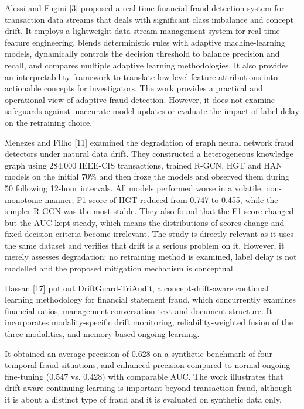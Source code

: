 \documentclass[11pt,letterpaper]{report}
\begin{document}
Alessi and Fugini [3] proposed a real-time financial fraud detection system for transaction data streams that deals with significant class imbalance and concept drift. It employs a lightweight data stream management system for real-time feature engineering, blends deterministic rules with adaptive machine-learning models, dynamically controls the decision threshold to balance precision and recall, and compares multiple adaptive learning methodologies. It also provides an interpretability framework to translate low-level feature attributions into actionable concepts for investigators. The work provides a practical and operational view of adaptive fraud detection. However, it does not examine safeguards against inaccurate model updates or evaluate the impact of label delay on the retraining choice.

Menezes and Filho [11] examined the degradation of graph neural network fraud detectors under natural data drift. They constructed a heterogeneous knowledge graph using 284,000 IEEE-CIS transactions, trained R-GCN, HGT and HAN models on the initial 70\% and then froze the models and observed them during 50 following 12-hour intervals. All models performed worse in a volatile, non-monotonic manner; F1-score of HGT reduced from 0.747 to 0.455, while the simpler R-GCN was the most stable. They also found that the F1 score changed but the AUC kept steady, which means the distributions of scores change and fixed decision criteria become irrelevant. The study is directly relevant as it uses the same dataset and verifies that drift is a serious problem on it. However, it merely assesses degradation: no retraining method is examined, label delay is not modelled and the proposed mitigation mechanism is conceptual.

Hassan [17] put out DriftGuard-TriAudit, a concept-drift-aware continual learning methodology for financial statement fraud, which concurrently examines financial ratios, management conversation text and document structure. It incorporates modality-specific drift monitoring, reliability-weighted fusion of the three modalities, and memory-based ongoing learning.

It obtained an average precision of 0.628 on a synthetic benchmark of four temporal fraud situations, and enhanced precision compared to normal ongoing fine-tuning (0.547 vs. 0.428) with comparable AUC. The work illustrates that drift-aware continuing learning is important beyond transaction fraud, although it is about a distinct type of fraud and it is evaluated on synthetic data only.
\end{document}
